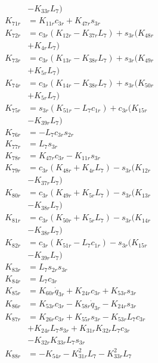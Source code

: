 \begin{multicols}{2}
\begin{align}
&- K_{33r}L_7) \nonumber \\
K_{71r} &= K_{11r}c_{3r} + K_{47r}s_{3r} \nonumber \\
K_{72r} &= c_{3r}(K_{12r} - K_{37r}L_7) + s_{3r}(K_{48r}  \nonumber \\
&+ K_{4r}L_7) \nonumber \\
K_{73r} &= c_{3r}(K_{13r} - K_{38r}L_7) + s_{3r}(K_{49r}  \nonumber \\
&+ K_{5r}L_7) \nonumber \\
K_{74r} &= c_{3r}(K_{14r} - K_{38r}L_7) + s_{3r}(K_{50r}  \nonumber \\
&+ K_{5r}L_7) \nonumber \\
K_{75r} &= s_{3r}(K_{51r} - L_7c_{1r}) + c_{3r}(K_{15r}  \nonumber \\
&- K_{39r}L_7) \nonumber \\
K_{76r} &= -L_7c_{3r}s_{2r} \nonumber \\
K_{77r} &= L_7s_{3r} \nonumber \\
K_{78r} &= K_{47r}c_{3r} - K_{11r}s_{3r} \nonumber \\
K_{79r} &= c_{3r}(K_{48r} + K_{4r}L_7) - s_{3r}(K_{12r}  \nonumber \\
&- K_{37r}L_7) \nonumber \\
K_{80r} &= c_{3r}(K_{49r} + K_{5r}L_7) - s_{3r}(K_{13r}  \nonumber \\
&- K_{38r}L_7) \nonumber \\
K_{81r} &= c_{3r}(K_{50r} + K_{5r}L_7) - s_{3r}(K_{14r}  \nonumber \\
&- K_{38r}L_7) \nonumber \\
K_{82r} &= c_{3r}(K_{51r} - L_7c_{1r}) - s_{3r}(K_{15r}  \nonumber \\
&- K_{39r}L_7) \nonumber \\
K_{83r} &= L_7s_{2r}s_{3r} \nonumber \\
K_{84r} &= L_7c_{3r} \nonumber \\
K_{85r} &= K_{60r}\dot{q}_{3r} + K_{24r}c_{3r} + K_{53r}s_{3r} \nonumber \\
K_{86r} &= K_{53r}c_{3r} - K_{58r}\dot{q}_{3r} - K_{24r}s_{3r} \nonumber \\
K_{87r} &= K_{26r}c_{3r} + K_{55r}s_{3r} - K_{53r}L_7c_{3r}  \nonumber \\
&+ K_{24r}L_7s_{3r} + K_{31r}K_{32r}L_7c_{3r}  \nonumber \\
&- K_{32r}K_{33r}L_7s_{3r} \nonumber \\
K_{88r} &= - K_{54r} - K_{31r}^2L_7 - K_{33r}^2L_7 \nonumber \\

\end{align}
\end{multicols}
